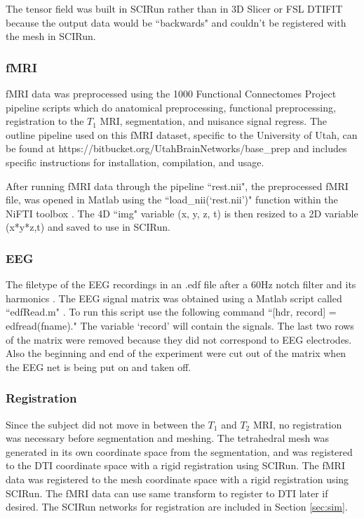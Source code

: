 The tensor field was built in SCIRun rather than in 3D Slicer \cite{ref:slicer} or FSL DTIFIT because the output data would be ``backwards" and couldn't be registered with the mesh in SCIRun.

\newpage

\subsubsection{fMRI}
\label{sec:fmripre}

fMRI data was preprocessed using the 1000 Functional Connectomes Project pipeline scripts \cite{ref:fcon} which do anatomical preprocessing, functional preprocessing, registration to the $T_1$ MRI, segmentation, and nuisance signal regress. The outline pipeline used on this fMRI dataset, specific to the University of Utah, can be found at https://bitbucket.org/UtahBrainNetworks/base\_prep and includes specific instructions for installation, compilation, and usage.  

After running fMRI data through the pipeline ``rest.nii", the preprocessed fMRI file, was opened in Matlab using the ``load\_nii(`rest.nii')" function within the NiFTI toolbox \cite{ref:nifti}. The 4D ``img" variable (x, y, z, t) is then resized to a 2D variable (x*y*z,t) and saved to use in SCIRun. 

\subsubsection{EEG}

The filetype of the EEG recordings in an .edf file after a 60Hz notch filter and its harmonics \cite{ref:filter}. The EEG signal matrix was obtained using a Matlab script called ``edfRead.m" \cite{ref:edfread}. To run this script use the following command ``[hdr, record] = edfread(fname)." The variable `record' will contain the signals. The last two rows of the matrix were removed because they did not correspond to EEG electrodes. Also the beginning and end of the experiment were cut out of the matrix when the EEG net is being put on and taken off. 

\subsubsection{Registration}

Since the subject did not move in between the $T_1$ and $T_2$ MRI, no registration was necessary before segmentation and meshing. The tetrahedral mesh was generated in its own coordinate space from the segmentation, and was registered to the DTI coordinate space with a rigid registration using SCIRun. The fMRI data was registered to the mesh coordinate space with a rigid registration using SCIRun. The fMRI data can use same transform to register to DTI later if desired. The SCIRun networks for registration are included in Section \ref{sec:sim}.

